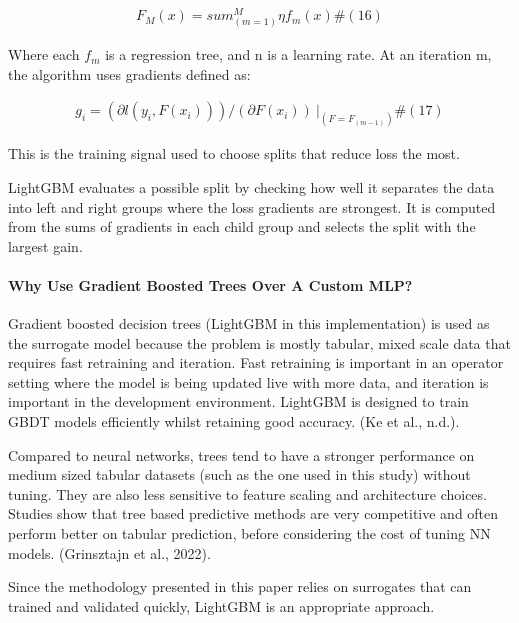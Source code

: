 \documentclass[11pt]{article}
\begin{document}
\[\begin{array}{r}
F_{M}(x) = sum_{(m = 1)}^{M}\eta f_{m}(x)\#(16)
\end{array}\]

Where each \(f_{m}\) is a regression tree, and n is a learning rate. At
an iteration m, the algorithm uses gradients defined as:

\[\begin{array}{r}
g_{i} = \left( \partial l\left( y_{i},F\left( x_{i} \right) \right) \right)\text{/}\left( \partial F\left( x_{i} \right) \right)\left. \  \right|_{\left( F = F_{(m - 1)} \right)}\#(17)
\end{array}\]

This is the training signal used to choose splits that reduce loss the
most.

LightGBM evaluates a possible split by checking how well it separates
the data into left and right groups where the loss gradients are
strongest. It is computed from the sums of gradients in each child group
and selects the split with the largest gain.

\paragraph{Why Use Gradient Boosted Trees Over A Custom
MLP?}\label{why-use-gradient-boosted-trees-over-a-custom-mlp}

Gradient boosted decision trees (LightGBM in this implementation) is
used as the surrogate model because the problem is mostly tabular, mixed
scale data that requires fast retraining and iteration. Fast retraining
is important in an operator setting where the model is being updated
live with more data, and iteration is important in the development
environment. LightGBM is designed to train GBDT models efficiently
whilst retaining good accuracy. (Ke et al., n.d.).

Compared to neural networks, trees tend to have a stronger performance
on medium sized tabular datasets (such as the one used in this study)
without tuning. They are also less sensitive to feature scaling and
architecture choices. Studies show that tree based predictive methods
are very competitive and often perform better on tabular prediction,
before considering the cost of tuning NN models. (Grinsztajn et al.,
2022).

Since the methodology presented in this paper relies on surrogates that
can trained and validated quickly, LightGBM is an appropriate approach.
\end{document}
